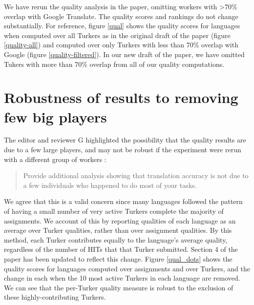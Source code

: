 \documentclass[11pt]{article}
\begin{document}
We have rerun the quality analysis in the paper, omitting workers with \textgreater 70\% overlap with Google Translate. The quality scores and rankings do not change substantially. For reference, figure \ref{qual} shows the quality scores for languages when computed over all Turkers as in the original draft of the paper (figure \ref{quality-all}) and computed over only Turkers with less than 70\% overlap with Google (figure \ref{quality-filtered}). In our new draft of the paper, we have omitted Tukers with more than 70\% overlap from all of our quality computations.




\section{Robustness of results to removing few big players}

The editor and reviewer G highlighted the possibility that the quality results are due to a few large players, and may not be robust if the experiment were rerun with a different group of workers : 
\begin{quote}
Provide additional analysis showing that translation accuracy is not due to a few individuals who happened to do most of your tasks.
\end{quote}

We agree that this is a valid concern since many languages followed the pattern of having a small number of very active Turkers complete the majority of assignments. We account of this by reporting qualities of each language as an average over Turker qualities, rather than over assignment qualities. By this method, each Turker contributes equally to the language's average quality, regardless of the number of HITs that that Turker submitted. Section 4 of the paper has been updated to reflect this change. Figure \ref{qual_dots} shows the quality scores for languages computed over assignments and over Turkers, and the change in each when the 10 most active Turkers in each language are removed. We can see that the per-Turker quality measure is robust to the exclusion of these highly-contributing Turkers. 
\end{document}
